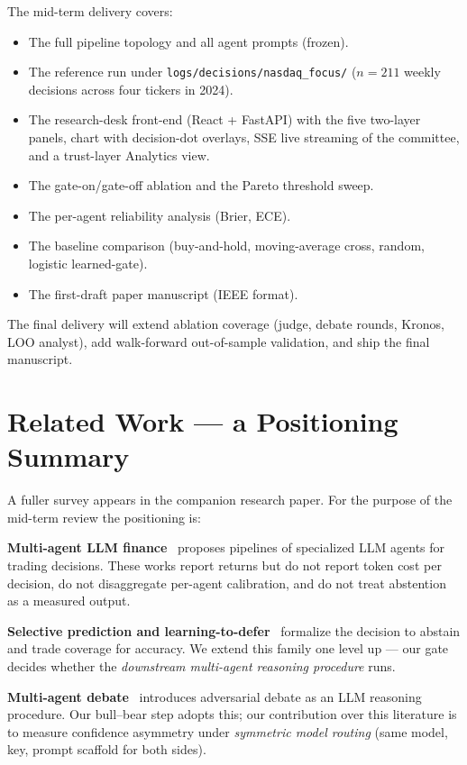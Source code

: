 \documentclass[conference]{IEEEtran}
\begin{document}
The mid-term delivery covers:
\begin{itemize}
  \item The full pipeline topology and all agent prompts (frozen).
  \item The reference run under
  \texttt{logs/decisions/nasdaq\_focus/} ($n{=}211$ weekly decisions
  across four tickers in 2024).
  \item The research-desk front-end (React + FastAPI) with the five
  two-layer panels, chart with decision-dot overlays, SSE live
  streaming of the committee, and a trust-layer Analytics view.
  \item The gate-on/gate-off ablation and the Pareto threshold
  sweep.
  \item The per-agent reliability analysis (Brier, ECE).
  \item The baseline comparison (buy-and-hold, moving-average
  cross, random, logistic learned-gate).
  \item The first-draft paper manuscript (IEEE format).
\end{itemize}

The final delivery will extend ablation coverage (judge, debate
rounds, Kronos, LOO analyst), add walk-forward out-of-sample
validation, and ship the final manuscript.

\section{Related Work --- a Positioning Summary}

A fuller survey appears in the companion research paper. For the
purpose of the mid-term review the positioning is:

\textbf{Multi-agent LLM finance}~\cite{tradingagents,finagent,finmem}
proposes pipelines of specialized LLM agents for trading decisions.
These works report returns but do not report token cost per decision,
do not disaggregate per-agent calibration, and do not treat
abstention as a measured output.

\textbf{Selective prediction and learning-to-defer}~\cite{
chow1970,geifman2017selective,mozannar2020defer} formalize the
decision to abstain and trade coverage for accuracy. We extend this
family one level up --- our gate decides whether the \emph{downstream
multi-agent reasoning procedure} runs.

\textbf{Multi-agent debate}~\cite{du2023debate,liang2023divergent}
introduces adversarial debate as an LLM reasoning procedure. Our
bull--bear step adopts this; our contribution over this literature is
to measure confidence asymmetry under \emph{symmetric model routing}
(same model, key, prompt scaffold for both sides).
\end{document}
